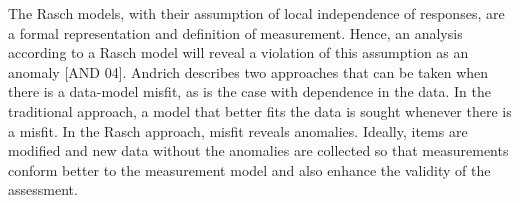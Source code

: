 The Rasch models, with their assumption of local independence of responses, are
a formal representation and deﬁnition of measurement. Hence, an analysis according
to a Rasch model will reveal a violation of this assumption as an anomaly [AND 04].
Andrich describes two approaches that can be taken when there is a data-model misﬁt,
as is the case with dependence in the data. In the traditional approach, a model that
better ﬁts the data is sought whenever there is a misﬁt. In the Rasch approach, misﬁt
reveals anomalies. Ideally, items are modiﬁed and new data without the anomalies are
collected so that measurements conform better to the measurement model and also
enhance the validity of the assessment.